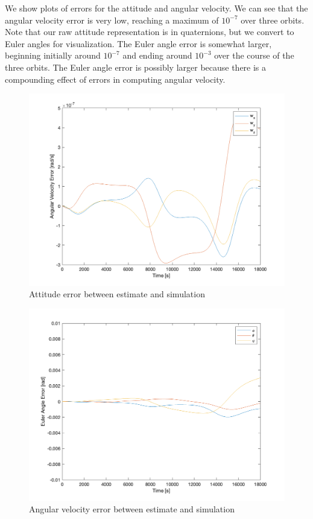 We show plots of errors for the attitude and angular velocity. We can see that the angular velocity error is very low, reaching a maximum of $10^{-7}$ over three orbits. Note that our raw attitude representation is in quaternions, but we convert to Euler angles for visualization. The Euler angle error is somewhat larger, beginning initially around $10^{-7}$ and ending around $10^{-3}$ over the course of the three orbits. The Euler angle error is possibly larger because there is a compounding effect of errors in computing angular velocity.

\begin{figure}[H]
\centering
\includegraphics[scale=0.6]{Images/ps7_problem6_angvel_err.png}
\caption{Attitude error between estimate and simulation}
\label{fig:ps7_problem5a_angvel_sim}
\end{figure}

\begin{figure}[H]
\centering
\includegraphics[scale=0.6]{Images/ps7_problem6_angle_err.png}
\caption{Angular velocity error between estimate and simulation}
\label{fig:ps7_problem5a_angvel_sim}
\end{figure}